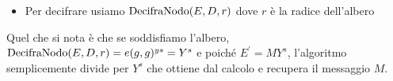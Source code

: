 \begin{description}
\begin{itemize}
\item Per decifrare usiamo $\operatorname{DecifraNodo} (E,D,r)$ dove $r$ è la radice dell'albero
\end{itemize}
Quel che si nota è che se soddisfiamo l'albero, $\operatorname{DecifraNodo} (E,D,r) = e(g,g)^{ys} = Y^s$ e poiché $E^\prime = MY^s$, l'algoritmo semplicemente divide per $Y^s$ che ottiene dal calcolo e recupera il messaggio $M$.
\end{description}



